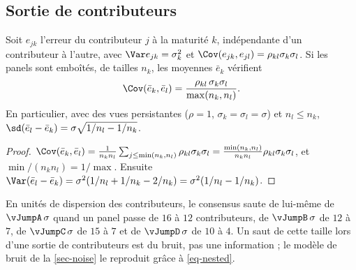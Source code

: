 \subsection{Sortie de contributeurs}
\begin{proposition}\label{prop-nested}
Soit $e_{jk}$ l'erreur du contributeur $j$ à la maturité $k$, indépendante d'un contributeur à l'autre, avec
$\Var e_{jk}=\sigma_k^2$ et $\Cov(e_{jk},e_{jl})=\rho_{kl}\sigma_k\sigma_l$. Si les panels sont emboîtés, de tailles
$n_k$, les moyennes $\bar e_k$ vérifient
\begin{equation}\label{eq-nested}
\Cov(\bar e_k,\bar e_l)=\frac{\rho_{kl}\,\sigma_k\sigma_l}{\max(n_k,n_l)}.
\end{equation}
En particulier, avec des vues persistantes ($\rho=1$, $\sigma_k=\sigma_l=\sigma$) et $n_l\le n_k$,
$\sd(\bar e_l-\bar e_k)=\sigma\sqrt{1/n_l-1/n_k}$.
\end{proposition}
\begin{proof}
$\Cov(\bar e_k,\bar e_l)=\frac{1}{n_kn_l}\sum_{j\le\min(n_k,n_l)}\rho_{kl}\sigma_k\sigma_l
=\frac{\min(n_k,n_l)}{n_kn_l}\rho_{kl}\sigma_k\sigma_l$, et $\min/(n_kn_l)=1/\max$. Ensuite
$\Var(\bar e_l-\bar e_k)=\sigma^2(1/n_l+1/n_k-2/n_k)=\sigma^2(1/n_l-1/n_k)$.
\end{proof}

\begin{example}
En unités de dispersion des contributeurs, le consensus saute de lui-même de $\vJumpA\,\sigma$ quand un panel passe
de $16$ à $12$ contributeurs, de $\vJumpB\,\sigma$ de $12$ à $7$, de $\vJumpC\,\sigma$ de $15$ à $7$ et de
$\vJumpD\,\sigma$ de $10$ à $4$. Un saut de cette taille lors d'une sortie de contributeurs est du bruit, pas une
information ; le modèle de bruit de la \cref{sec-noise} le reproduit grâce à \cref{eq-nested}.
\end{example}

